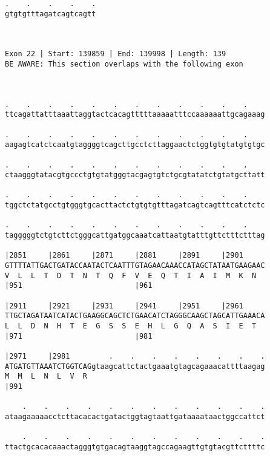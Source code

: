 \documentclass{article}
\begin{document}
\begin{Verbatim}
.    .    .    .    .
gtgtgtttagatcagtcagtt
                     
                     
 
Exon 22 | Start: 139859 | End: 139998 | Length: 139
BE AWARE: This section overlaps with the following exon



.    .    .    .    .    .    .    .    .    .    .    .    
ttcagattatttaaattaggtactcacagtttttaaaaatttccaaaaaattgcagaaag
                                                            
.    .    .    .    .    .    .    .    .    .    .    .    
aagagtcatctcaatgtaggggtcagcttgcctcttaggaactctggtgtgtatgtgtgc
                                                            
.    .    .    .    .    .    .    .    .    .    .    .    
ctaagggtatacgtgccctgtgtatgggtacgagtgtctgcgtatatctgtatgcttatt
                                                            
.    .    .    .    .    .    .    .    .    .    .    .    
tggctctatgcctgtgggtgcacttactctgtgtgtttagatcagtcagtttcatctctc
                                                            
.    .    .    .    .    .    .    .    .    .    .    .    
tagggggtctgtcttctgggcattgatggcaaatcattaatgtatttgttctttctttag
                                                            
|2851     |2861     |2871     |2881     |2891     |2901     
GTTTTATTGACTGATACCAATACTCAATTTGTAGAACAAACCATAGCTATAATGAAGAAC
V  L  L  T  D  T  N  T  Q  F  V  E  Q  T  I  A  I  M  K  N  
|951                          |961                          
  
|2911     |2921     |2931     |2941     |2951     |2961     
TTGCTAGATAATCATACTGAAGGCAGCTCTGAACATCTAGGGCAAGCTAGCATTGAAACA
L  L  D  N  H  T  E  G  S  S  E  H  L  G  Q  A  S  I  E  T  
|971                          |981                          
  
|2971     |2981         .    .    .    .    .    .    .    .
ATGATGTTAAATCTGGTCAGgtaagcattctactgaaatgtagcagaaacattttaagag
M  M  L  N  L  V  R                                         
|991                                                        
  
    .    .    .    .    .    .    .    .    .    .    .    .
ataagaaaaacctcttacacactgatactggtagtaattgataaaataactggccattct
                                                            
    .    .    .    .    .    .    .    .    .    .    .    .
ttactgcacacaaactagggtgtgacagtaaggtagccagaagttgtgtacgttcttttc
                                                            

\end{Verbatim}
\end{document}
